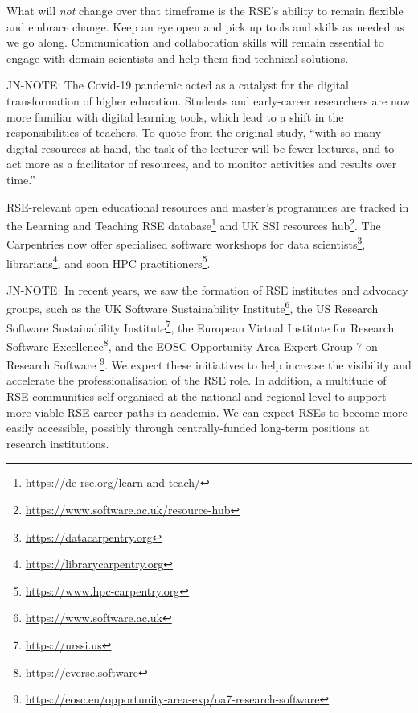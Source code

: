 \documentclass{eceasst}
\begin{document}
What will \emph{not} change over that timeframe is the RSE's ability to remain
flexible and embrace change. Keep an eye open and pick up tools and skills
as needed as we go along.
Communication and collaboration skills will remain essential to engage
with domain scientists and help them find technical solutions.

\begin{FramedParagraphWithFootnotes}
JN-NOTE:
The Covid-19 pandemic acted as a catalyst for the digital transformation
of higher education\cite{Bygstad2022}. Students and early-career researchers
are now more familiar with digital learning tools, which lead to a shift
in the responsibilities of teachers. To quote from the original study,
``with so many digital resources at hand,
the task of the lecturer will be fewer lectures,
and to act more as a facilitator of resources,
and to monitor activities and results over time.''\cite{Bygstad2022}

RSE-relevant open educational resources and master's programmes are tracked
in the Learning and Teaching RSE database\footnote{\url{https://de-rse.org/learn-and-teach/}}
and UK SSI resources hub\footnote{\url{https://www.software.ac.uk/resource-hub}}.
The Carpentries now offer specialised software workshops
for data scientists\footnote{\url{https://datacarpentry.org}},
librarians\footnote{\url{https://librarycarpentry.org}},
and soon HPC practitioners\footnote{\url{https://www.hpc-carpentry.org}}.
\end{FramedParagraphWithFootnotes}

\begin{FramedParagraphWithFootnotes}
JN-NOTE:
In recent years, we saw the formation of RSE institutes and advocacy groups, such as
the UK Software Sustainability Institute\footnote{\url{https://www.software.ac.uk}},
the US Research Software Sustainability Institute\footnote{\url{https://urssi.us}},
the European Virtual Institute for Research Software Excellence\footnote{\url{https://everse.software}},
and the EOSC Opportunity Area Expert Group 7 on Research Software%
\footnote{\url{https://eosc.eu/opportunity-area-exp/oa7-research-software}}.
We expect these initiatives to help increase the visibility and accelerate
the professionalisation of the RSE role.
In addition, a multitude of RSE communities self-organised at the national
and regional level to support more viable RSE career paths in academia.
We can expect RSEs to become more easily accessible,
possibly through centrally-funded long-term positions at research institutions.
\end{FramedParagraphWithFootnotes}
\end{document}
